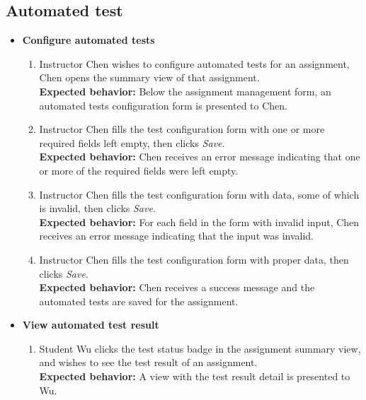 \subsection{Automated test}
\begin{itemize}
    \item {\bf Configure automated tests} \begin{enumerate}
        \item Instructor Chen wishes to configure automated tests for an
            assignment, Chen opens the summary view of that assignment. \\
        {\bf Expected behavior:} Below the assignment management form, an
            automated tests configuration form is presented to Chen.

        \item Instructor Chen fills the test configuration form with one or more
            required fields left empty, then clicks \emph{Save}. \\
        {\bf Expected behavior:} Chen receives an error message indicating that
            one or more of the required fields were left empty.

        \item Instructor Chen fills the test configuration form with data, some
            of which is invalid, then clicks \emph{Save}. \\
        {\bf Expected behavior:} For each field in the form with invalid input,
            Chen receives an error message indicating that
            the input was invalid.

        \item Instructor Chen fills the test configuration form with proper data,
            then clicks \emph{Save}. \\
        {\bf Expected behavior:} Chen receives a success message and the automated
            tests are saved for the assignment.
    \end{enumerate}

    \item {\bf View automated test result} \begin{enumerate}
        \item Student Wu clicks the test status badge in the assignment
            summary view, and wishes to see the test result of an assignment. \\
        {\bf Expected behavior:} A view with the test result detail is
            presented to Wu.
    \end{enumerate}
\end{itemize}

